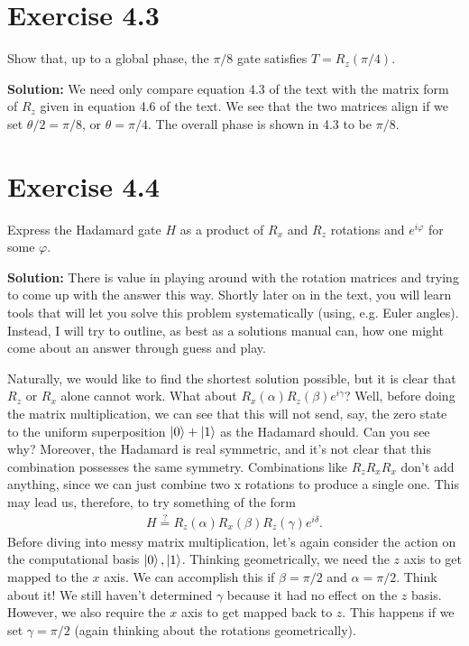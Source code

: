 \documentclass{book}
\begin{document}
\section*{Exercise 4.3}
    Show that, up to a global phase, the $\pi/8$ gate satisfies $T = R_z(\pi/4)$.
    
    \textbf{Solution:} We need only compare equation 4.3 of the text with the matrix form of $R_z$ given in equation 4.6 of the text. We see that the two matrices align if we set $\theta/2 = \pi/8$, or $\theta = \pi/4$. The overall phase is shown in 4.3 to be $\pi/8$.

\section*{Exercise 4.4}
    Express the Hadamard gate $H$ as a product of $R_x$ and $R_z$ rotations and $e^{i\varphi}$ for some $\varphi$.
    
    \textbf{Solution:} There is value in playing around with the rotation matrices and trying to come up with the answer this way. Shortly later on in the text, you will learn tools that will let you solve this problem systematically (using, e.g. Euler angles). Instead, I will try to outline, as best as a solutions manual can, how one might come about an answer through guess and play.
    
    Naturally, we would like to find the shortest solution possible, but it is clear that $R_z$ or $R_x$ alone cannot work. What about $R_x(\alpha) R_z(\beta) e^{i\gamma}$? Well, before doing the matrix multiplication, we can see that this will not send, say, the zero state to the uniform superposition $\ket{0} + \ket{1}$ as the Hadamard should. Can you see why? Moreover, the Hadamard is real symmetric, and it's not clear that this combination possesses the same symmetry. Combinations like $R_z R_x R_x$ don't add anything, since we can just combine two x rotations to produce a single one. This may lead us, therefore, to try something of the form
    \begin{align}
        H \stackrel{?}{=}  R_z(\alpha) R_x(\beta) R_z(\gamma) e^{i\delta}.
    \end{align}
    Before diving into messy matrix multiplication, let's again consider the action on the computational basis $\ket{0}, \ket{1}$. Thinking geometrically, we need the $z$ axis to get mapped to the $x$ axis. We can accomplish this if $\beta = \pi/2$ and $\alpha = \pi/2$. Think about it! We still haven't determined $\gamma$ because it had no effect on the $z$ basis. However, we also require the $x$ axis to get mapped back to $z$. This happens if we set $\gamma = \pi/2$ (again thinking about the rotations geometrically). 
    
\end{document}
